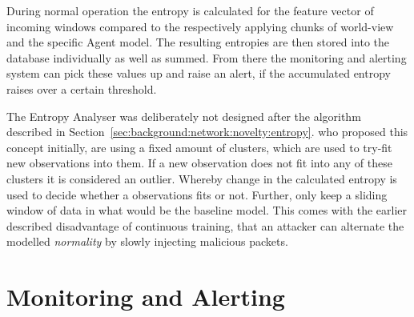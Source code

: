 During normal operation the entropy is calculated for the feature vector of incoming windows compared to the respectively applying chunks of world-view and the specific Agent model.
The resulting entropies are then stored into the database individually as well as summed. From there the monitoring and alerting system can pick these values up and raise an alert, if the accumulated entropy raises over a certain threshold.

The Entropy Analyser was deliberately not designed after the algorithm described in Section~\ref{sec:background:network:novelty:entropy}.
\textcite{Toshniwal2014} who proposed this concept initially, are using a fixed amount of clusters, which are used to try-fit new observations into them. If a new observation does not fit into any of these clusters it is considered an outlier. Whereby change in the calculated entropy is used to decide whether a observations fits or not.
Further, \textcite{Toshniwal2014} only keep a sliding window of data in what would be the baseline model. This comes with the earlier described disadvantage of continuous training, that an attacker can alternate the modelled \emph{normality} by slowly injecting malicious packets.

\newpage
\section{Monitoring and Alerting}
\label{sec:concept:mon}

